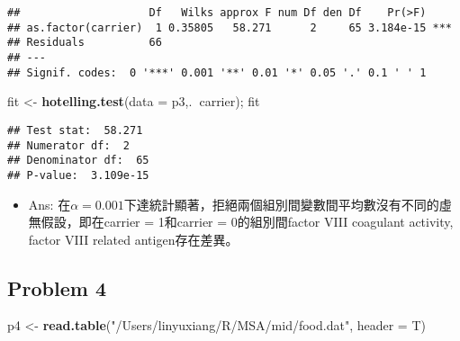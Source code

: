 \documentclass[]{article}
\newenvironment{Shaded}{\begin{snugshade}}{\end{snugshade}}
\newcommand{\CommentTok}[1]{\textcolor[rgb]{0.56,0.35,0.01}{\textit{#1}}}
\newcommand{\DataTypeTok}[1]{\textcolor[rgb]{0.13,0.29,0.53}{#1}}
\newcommand{\KeywordTok}[1]{\textcolor[rgb]{0.13,0.29,0.53}{\textbf{#1}}}
\newcommand{\NormalTok}[1]{#1}
\newcommand{\OperatorTok}[1]{\textcolor[rgb]{0.81,0.36,0.00}{\textbf{#1}}}
\newcommand{\StringTok}[1]{\textcolor[rgb]{0.31,0.60,0.02}{#1}}
\providecommand{\tightlist}{%
  \setlength{\itemsep}{0pt}\setlength{\parskip}{0pt}}
\begin{document}
\begin{Shaded}
\end{Shaded}

\begin{verbatim}
##                    Df   Wilks approx F num Df den Df    Pr(>F)    
## as.factor(carrier)  1 0.35805   58.271      2     65 3.184e-15 ***
## Residuals          66                                             
## ---
## Signif. codes:  0 '***' 0.001 '**' 0.01 '*' 0.05 '.' 0.1 ' ' 1
\end{verbatim}

\begin{Shaded}
\begin{Highlighting}[]
\NormalTok{fit <-}\StringTok{ }\KeywordTok{hotelling.test}\NormalTok{(}\DataTypeTok{data =}\NormalTok{ p3,.}\OperatorTok{~}\NormalTok{carrier); fit}
\end{Highlighting}
\end{Shaded}

\begin{verbatim}
## Test stat:  58.271 
## Numerator df:  2 
## Denominator df:  65 
## P-value:  3.109e-15
\end{verbatim}

\begin{itemize}
\tightlist
\item
  Ans:
  在\(\alpha = 0.001\)下達統計顯著，拒絕兩個組別間變數間平均數沒有不同的虛無假設，即在carrier
  = 1和carrier = 0的組別間factor VIII coagulant activity, factor VIII
  related antigen存在差異。
\end{itemize}

\hypertarget{problem-4}{%
\subsection{Problem 4}\label{problem-4}}

\begin{Shaded}
\begin{Highlighting}[]
\NormalTok{p4 <-}\StringTok{ }\KeywordTok{read.table}\NormalTok{(}\StringTok{"/Users/linyuxiang/R/MSA/mid/food.dat"}\NormalTok{, }\DataTypeTok{header =}\NormalTok{ T)}
\end{Highlighting}
\end{Shaded}
\end{document}
